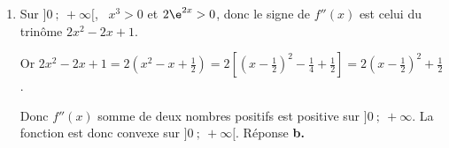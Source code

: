 \begin{enumerate}
\item  Sur $]0~;~+\infty[$, \, $x^3 > 0$ et $2\e^{2x} > 0$, donc le signe de $f''(x)$ est celui du trinôme $2x^2 - 2x +  1$.

Or $2x^2 - 2x +  1 = 2\left(x^2 - x + \frac{1}{2}\right) = 2\left[ \left (x - \frac{1}{2}\right)^2 - \frac{1}{4} + \frac{1}{2}\right ] = 2\left(x - \frac{1}{2}\right)^2 + \frac{1}{2}$. 

Donc $f''(x)$ somme de deux nombres positifs est positive sur $]0~;~+ \infty$. La fonction est donc convexe sur $]0~;~+\infty[$. \hfill{}Réponse \textbf{b.}








 
\end{enumerate}

\vspace{0,5cm}
